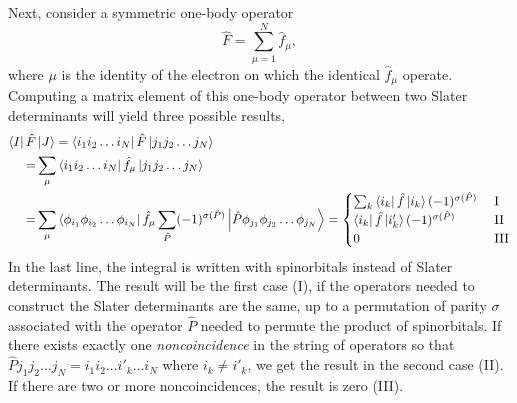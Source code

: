 Next, consider a symmetric one-body operator
\begin{equation}
    \hat{F} = \sum_{\mu = 1}^N \hat{f}_\mu,
\end{equation}
where $\mu$ is the identity of the electron on which the identical $\hat{f}_\mu$ operate.
Computing a matrix element of this one-body operator between two Slater determinants
will yield three possible results,
\begin{equation}
    \begin{aligned}
        \bra{I} \hat{F}& \ket{J} 
            = \bra{i_1 i_2 \dots i_N} \hat{F} \ket{j_1 j_2 \dots j_N} \\
        =& \sum_\mu \bra{i_1 i_2 \dots i_N} \hat{f}_\mu \ket{j_1 j_2 \dots j_N} \\
        =& \sum_\mu \bra{\phi_{i_1} \phi_{i_2} \dots \phi_{i_N}}
            \hat{f}_\mu \sum_{\hat{P}} (-1)^{\sigma(\hat{P})}
            \ket{\hat{P} \phi_{j_1} \phi_{j_2} \dots \phi_{j_N}}
        =
        \begin{cases}
           \sum_k \bra{i_k} \hat{f} \ket{i_k}(-1)^{\sigma(\hat{P})} &\ \text{I} \\
           \bra{i_k} \hat{f} \ket{i'_k}(-1)^{\sigma(\hat{P})} &\ \text{II} \\
           0 &\ \text{III}
        \end{cases}
    \end{aligned}
\end{equation}
In the last line, the integral is written with spinorbitals instead of Slater determinants.
The result will be the first case (I), if the operators needed to construct the Slater 
determinants are the same, up to a permutation of parity $\sigma$ associated
with the operator $\hat{P}$ needed to permute the product of spinorbitals. If there exists
exactly one \emph{noncoincidence} in the string of operators so that 
$\hat{P} j_1 j_2 \dots j_N = i_1 i_2 \dots i'_k \dots i_N$ where $i_k \neq i'_k$, we get
the result in the second case (II). If there are two or more noncoincidences, the result
is zero (III).

